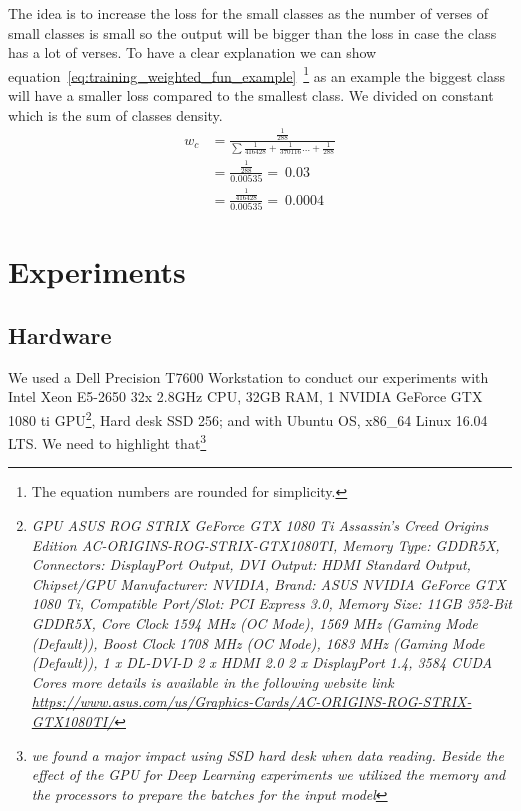 The idea is to increase the loss for the small classes as the number of verses of small classes is small so the output will be bigger than the loss in case the class has a lot of verses. To have a clear explanation we can show equation~\ref{eq:training_weighted_fun_example}~\footnote{The equation numbers are rounded for simplicity.} as an example the biggest class will have a smaller loss compared to the smallest class. We divided on constant which is the sum of classes density.%
\begin{subequations}
  \begin{align}
    w_c &=  \frac{\frac{1}{288}}{\sum\frac{1}{416428}+\frac{1}{370116}\dots+\frac{1}{288}}\\
       &= \frac{\frac{1}{288}}{0.00535} = ~0.03 \\
       &= \frac{\frac{1}{416428}}{0.00535} = ~0.0004
  \end{align}\label{eq:training_weighted_fun_example}
\end{subequations}

\clearpage

\section{Experiments}

\subsection{Hardware}

We used a Dell Precision T7600 Workstation to conduct our experiments with Intel Xeon E5-2650 32x 2.8GHz CPU, 32GB RAM, 1 NVIDIA GeForce GTX 1080 ti GPU\footnote{\textit{GPU ASUS ROG STRIX GeForce GTX 1080 Ti Assassin's Creed Origins Edition AC-ORIGINS-ROG-STRIX-GTX1080TI, Memory Type: GDDR5X, Connectors: DisplayPort Output, DVI Output: HDMI Standard Output, Chipset/GPU Manufacturer: NVIDIA, Brand: ASUS NVIDIA GeForce GTX 1080 Ti, Compatible Port/Slot: PCI Express 3.0, Memory Size: 11GB 352-Bit GDDR5X, Core Clock 1594 MHz (OC Mode), 1569 MHz (Gaming Mode (Default)), Boost Clock 1708 MHz (OC Mode), 1683 MHz (Gaming Mode (Default)), 1 x DL-DVI-D 2 x HDMI 2.0 2 x DisplayPort 1.4, 3584 CUDA Cores more details is available in the following website link \url{https://www.asus.com/us/Graphics-Cards/AC-ORIGINS-ROG-STRIX-GTX1080TI/}} }, Hard desk SSD 256; and with Ubuntu OS, x86\_64 Linux 16.04 LTS. We need to highlight that\footnote{\textit{we found a major impact using SSD hard desk when data reading. Beside the effect of the GPU for Deep Learning experiments we utilized the memory and the processors to prepare the batches for the input model}}


